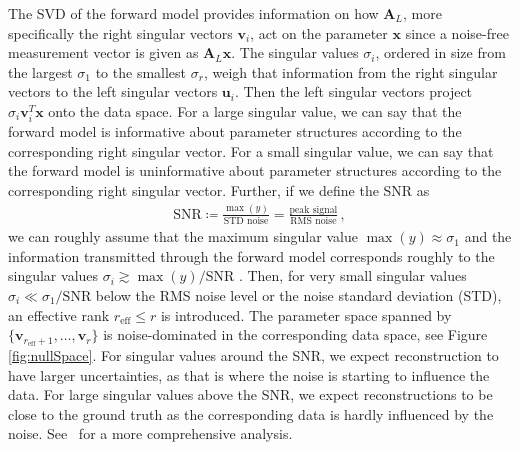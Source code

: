 The SVD of the forward model provides information on how $\bm{A}_L$, more specifically the right singular vectors $\bm{v}_i$, act on the parameter $\bm{x}$ since a noise-free measurement vector is given as $\bm{A}_L\bm{x}$.
The singular values $\sigma_i $, ordered in size from the largest $\sigma_1$ to the smallest $\sigma_{r}$, weigh that information from the right singular vectors to the left singular vectors $\bm{u}_i$.
Then the left singular vectors project $\sigma_i \bm{v}^T_i \bm{x} $ onto the data space.
For a large singular value, we can say that the forward model is informative about parameter structures according to the corresponding right singular vector. 
For a small singular value, we can say that the forward model is uninformative about parameter structures according to the corresponding right singular vector.
Further, if we define the SNR as
\begin{align}
	\text{SNR} \coloneqq \frac{\max(y)}{\text{STD noise}} = \frac{\text{peak signal}}{\text{RMS noise}} \label{eq:SNR} \, ,
\end{align}
we can roughly assume that the maximum singular value $\max(y) \approx \sigma_1$ and the information transmitted through the forward model corresponds roughly to the singular values $\sigma_i \gtrsim \max(y)/ \text{SNR}$ \cite{fox2025BlokkLecNot}.
Then, for very small singular values $\sigma_i \ll \sigma_1/\text{SNR}$ below the RMS noise level or the noise standard deviation (STD), an effective rank $r_{\text{eff}} \leq r$ is introduced.
The parameter space spanned by $ \{\bm{v}_{r_{\text{eff}} +1}, \dots ,\bm{v}_r \}$ is noise-dominated in the corresponding data space, see Figure \ref{fig:nullSpace}.
For singular values around the SNR, we expect reconstruction to have larger uncertainties, as that is where the noise is starting to influence the data.
For large singular values above the SNR, we expect reconstructions to be close to the ground truth as the corresponding data is hardly influenced by the noise.
See~\cite{tan2016LecNot} for a more comprehensive analysis.

